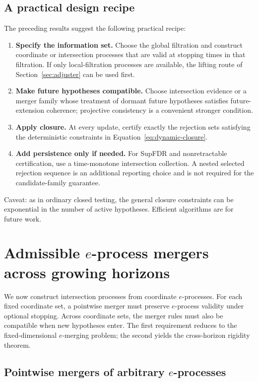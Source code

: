 \documentclass[11pt]{article}
\numberwithin{equation}{section}
\theoremstyle{plain}
\theoremstyle{definition}
\begin{document}
\subsection{A practical design recipe}

The preceding results suggest the following practical recipe:
\begin{enumerate}
\item \textbf{Specify the information set.} Choose the global filtration and construct coordinate or intersection processes that are valid at stopping times in that filtration. If only local-filtration processes are available, the lifting route of Section~\ref{sec:adjuster} can be used first.
\item \textbf{Make future hypotheses compatible.} Choose intersection evidence or a merger family whose treatment of dormant future hypotheses satisfies future-extension coherence; projective consistency is a convenient stronger condition.
\item \textbf{Apply closure.} At every update, certify exactly the rejection sets satisfying the deterministic constraints in Equation~\eqref{eq:dynamic-closure}.
\item \textbf{Add persistence only if needed.} For SupFDR and nonretractable certification, use a time-monotone intersection collection. A nested selected rejection sequence is an additional reporting choice and is not required for the candidate-family guarantee.
\end{enumerate}
Caveat: as in ordinary closed testing, the general closure constraints can be exponential in the number of active hypotheses. Efficient algorithms are for future work.


\section{Admissible \texorpdfstring{$e$}{e}-process mergers across growing horizons}\label{sec:mergers}

We now construct intersection processes from coordinate $e$-processes. For each fixed coordinate set, a pointwise merger must preserve $e$-process validity under optional stopping. Across coordinate sets, the merger rules must also be compatible when new hypotheses enter. The first requirement reduces to the fixed-dimensional $e$-merging problem; the second yields the cross-horizon rigidity theorem.

\subsection{Pointwise mergers of arbitrary \texorpdfstring{$e$}{e}-processes}
\end{document}
